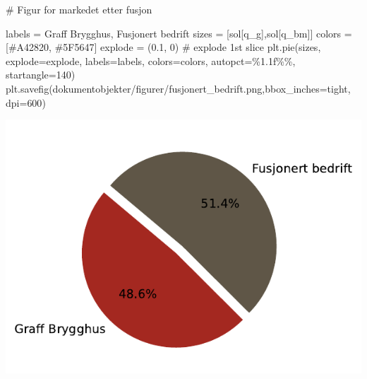 \documentclass[
  12pt,
  a4paper,
  DIV=11,
  numbers=noendperiod]{scrartcl}
\newenvironment{Shaded}{\begin{snugshade}}{\end{snugshade}}
\newcommand{\CommentTok}[1]{\textcolor[rgb]{0.37,0.37,0.37}{#1}}
\newcommand{\DecValTok}[1]{\textcolor[rgb]{0.68,0.00,0.00}{#1}}
\newcommand{\FloatTok}[1]{\textcolor[rgb]{0.68,0.00,0.00}{#1}}
\newcommand{\NormalTok}[1]{\textcolor[rgb]{0.00,0.23,0.31}{#1}}
\newcommand{\OperatorTok}[1]{\textcolor[rgb]{0.37,0.37,0.37}{#1}}
\newcommand{\SpecialCharTok}[1]{\textcolor[rgb]{0.37,0.37,0.37}{#1}}
\newcommand{\StringTok}[1]{\textcolor[rgb]{0.13,0.47,0.30}{#1}}
\begin{document}
\begin{Shaded}
\begin{Highlighting}[]
\CommentTok{\# Figur for markedet etter fusjon}

\NormalTok{labels }\OperatorTok{=} \StringTok{\textquotesingle{}Graff Brygghus\textquotesingle{}}\NormalTok{, }\StringTok{\textquotesingle{}Fusjonert bedrift\textquotesingle{}}
\NormalTok{sizes }\OperatorTok{=}\NormalTok{ [sol[q\_g],sol[q\_bm]]}
\NormalTok{colors }\OperatorTok{=}\NormalTok{ [}\StringTok{\textquotesingle{}\#A42820\textquotesingle{}}\NormalTok{, }\StringTok{\textquotesingle{}\#5F5647\textquotesingle{}}\NormalTok{]}
\NormalTok{explode }\OperatorTok{=}\NormalTok{ (}\FloatTok{0.1}\NormalTok{, }\DecValTok{0}\NormalTok{)  }\CommentTok{\# explode 1st slice}
\NormalTok{plt.pie(sizes, explode}\OperatorTok{=}\NormalTok{explode, labels}\OperatorTok{=}\NormalTok{labels, colors}\OperatorTok{=}\NormalTok{colors, autopct}\OperatorTok{=}\StringTok{\textquotesingle{}}\SpecialCharTok{\%1.1f\%\%}\StringTok{\textquotesingle{}}\NormalTok{, startangle}\OperatorTok{=}\DecValTok{140}\NormalTok{)}
\NormalTok{plt.savefig(}\StringTok{\textquotesingle{}dokumentobjekter/figurer/fusjonert\_bedrift.png\textquotesingle{}}\NormalTok{,bbox\_inches}\OperatorTok{=}\StringTok{\textquotesingle{}tight\textquotesingle{}}\NormalTok{, dpi}\OperatorTok{=}\DecValTok{600}\NormalTok{)}
\end{Highlighting}
\end{Shaded}

\includegraphics{Kandidatnummer_30_mappeoppgave_2_SOK_2030_files/figure-pdf/cell-31-output-1.pdf}
\end{document}
